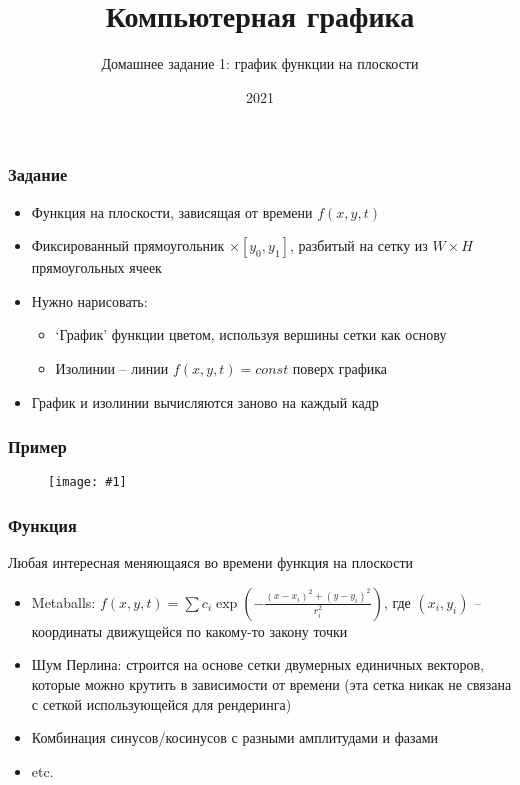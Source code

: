 \documentclass{beamer}
\title{Компьютерная графика}
\subtitle{Домашнее задание 1: график функции на плоскости}
\date{2021}
\newcommand{\slideimage}[1]{
  \begin{figure}
    \begin{adjustbox}{width=\textwidth, totalheight=\textheight-2\baselineskip-2\baselineskip,keepaspectratio}
      \texttt{[image: \#1]}
    \end{adjustbox}
  \end{figure}
}
\begin{document}
\frame{\titlepage}

\begin{frame}[fragile]
\frametitle{Задание}
\begin{itemize}
\item Функция на плоскости, зависящая от времени \begin{math}f(x, y, t)\end{math}
\pause
\item Фиксированный прямоугольник \begin{math}[x_0, x_1] \times [y_0, y_1]\end{math}, разбитый на сетку из \begin{math}W\times H\end{math} прямоугольных ячеек
\pause
\item Нужно нарисовать:
\begin{itemize}
\item `График' функции цветом, используя вершины сетки как основу
\pause
\item Изолинии -- линии \begin{math}f(x,y,t) = const\end{math} поверх графика
\end{itemize}
\pause
\item График и изолинии вычисляются заново на каждый кадр
\end{itemize}
\end{frame}

\begin{frame}[fragile]
\frametitle{Пример}
\slideimage{matlab-plot.png}
\end{frame}

\begin{frame}[fragile]
\frametitle{Функция}
Любая интересная меняющаяся во времени функция на плоскости
\begin{itemize}
\item Metaballs: \begin{math}f(x,y,t) = \sum c_i\exp\left(-\frac{(x-x_i)^2+(y-y_i)^2}{r_i^2}\right)\end{math}, где \begin{math}(x_i, y_i)\end{math} -- координаты движущейся по какому-то закону точки
\pause
\item Шум Перлина: строится на основе сетки двумерных единичных векторов, которые можно крутить в зависимости от времени (эта сетка никак не связана с сеткой использующейся для рендеринга)
\pause
\item Комбинация синусов/косинусов с разными амплитудами и фазами
\pause
\item etc.
\end{itemize}
\end{frame}
\end{document}
